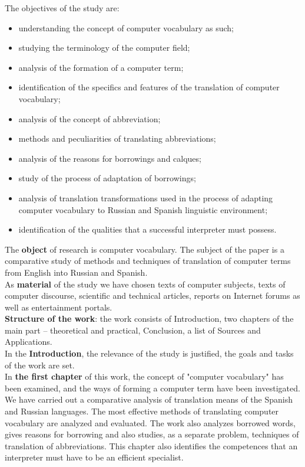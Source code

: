 \documentclass[12pt, a4paper, twoside]{report}
\begin{document}
The objectives of the study are:\\
\begin{itemize}
    \item understanding the concept of computer vocabulary as such;
    \item studying the terminology of the computer field;
    \item analysis of the formation of a computer term;
    \item identification of the specifics and features of the translation of computer vocabulary;
    \item analysis of the concept of abbreviation;
    \item methods and peculiarities of translating abbreviations;
    \item analysis of the reasons for borrowings and calques; 
    \item study of the process of adaptation of borrowings;
    \item analysis of translation transformations used in the process of adapting computer vocabulary to Russian and Spanish linguistic environment;
    \item identification of the qualities that a successful interpreter must possess.\\
\end{itemize}

The \textbf{object} of research is computer vocabulary. The subject of the paper is a comparative study of methods and techniques of translation of computer terms from English into Russian and Spanish.\\

As \textbf{material} of the study we have chosen texts of computer subjects, texts of computer discourse, scientific and technical articles, reports on Internet forums as well as entertainment portals.\\

\textbf{Structure of the work}: the work consists of Introduction, two chapters of the main part – theoretical and practical, Conclusion, a list of Sources and Applications.\\

In the \textbf{Introduction}, the relevance of the study is justified, the goals and tasks of the work are set.\\

In\textbf{ the first chapter} of this work, the concept of "computer vocabulary" has been examined, and the ways of forming a computer term have been investigated. We have carried out a comparative analysis of translation means of the Spanish and Russian languages. The most effective methods of translating computer vocabulary are analyzed and evaluated. The work also analyzes borrowed words, gives reasons for borrowing and also studies, as a separate problem, techniques of translation of abbreviations. This chapter also identifies the competences that an interpreter must have to be an efficient specialist.\\
\end{document}
